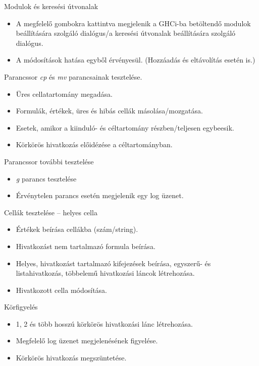 \begin{compactenum}
\begin{itemize}
	\end{itemize}
	\item Modulok és keresési útvonalak
	\begin{itemize}
		\item A megfelelő gombokra kattintva megjelenik a GHCi-ba betöltendő modulok beállítására szolgáló dialógus/a keresési útvonalak beállítására szolgáló dialógus.
		\item A módosítások hatása egyből érvényesül. (Hozzáadás és eltávolítás esetén is.)
	\end{itemize}	
	\item Parancssor \textit{cp} és \textit{mv} parancsainak tesztelése. 	
	\begin{itemize}
		\item Üres cellatartomány megadása.
		\item Formulák, értékek, üres és hibás cellák másolása/mozgatása.
		\item Esetek, amikor a kiinduló- és céltartomány részben/teljesen egybeesik.
		\item Körkörös hivatkozás előidézése a céltartományban.
	\end{itemize}
	\item Parancssor további tesztelése
	\begin{itemize}
		\item \textit{g} parancs tesztelése
		\item Érvénytelen parancs esetén megjelenik egy log üzenet.
	\end{itemize}
	\item Cellák tesztelése -- helyes cella
	\begin{itemize}
		\item Értékek beírása cellákba (szám/string).
		\item Hivatkozást nem tartalmazó formula beírása.
		\item Helyes, hivatkozást tartalmazó kifejezések beírása, egyszerű- és listahivatkozás, többelemű hivatkozási láncok létrehozása.
		\item Hivatkozott cella módosítása.
	\end{itemize}
	\item Körfigyelés
	\begin{itemize}
		\item 1, 2 és több hosszú körkörös hivatkozási lánc létrehozása.
		\item Megfelelő log üzenet megjelenésének figyelése.		
		\item Körkörös hivatkozás megszüntetése.
	\end{itemize}

\end{compactenum}

